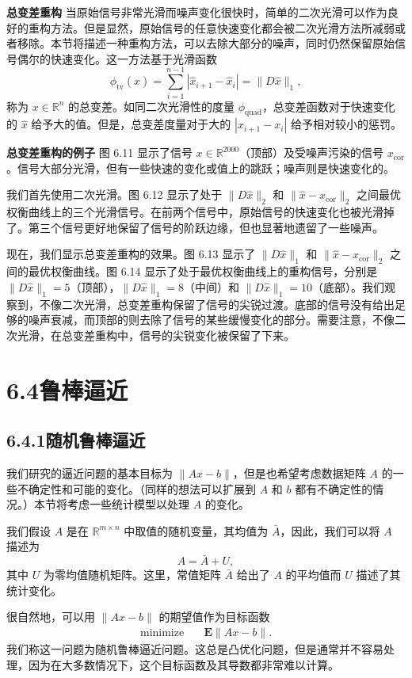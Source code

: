 \documentclass[UTF8,12pt,a4paper,fontset=fandol]{ctexart}
\begin{document}
\noindent\textbf{总变差重构}\quad
当原始信号非常光滑而噪声变化很快时，简单的二次光滑可以作为良好的重构方法。但是显然，原始信号的任意快速变化都会被二次光滑方法所减弱或者移除。本节将描述一种重构方法，可以去除大部分的噪声，同时仍然保留原始信号偶尔的快速变化。这一方法基于光滑函数
\[
\phi_{\mathrm{tv}}(\hat{x})=\sum_{i=1}^{n-1}|\hat{x}_{i+1}-\hat{x}_i|=\|D\hat{x}\|_1,
\]
称为 $x\in\mathbb{R}^n$ 的总变差。如同二次光滑性的度量 $\phi_{\mathrm{quad}}$，总变差函数对于快速变化的 $\hat{x}$ 给予大的值。但是，总变差度量对于大的 $|x_{i+1}-x_i|$ 给予相对较小的惩罚。

\noindent\textbf{总变差重构的例子}\quad
图 6.11 显示了信号 $x\in\mathbb{R}^{2000}$（顶部）及受噪声污染的信号 $x_{\mathrm{cor}}$。信号大部分光滑，但有一些快速的变化或值上的跳跃；噪声则是快速变化的。

我们首先使用二次光滑。图 6.12 显示了处于 $\|D\hat{x}\|_2$ 和 $\|\hat{x}-x_{\mathrm{cor}}\|_2$ 之间最优权衡曲线上的三个光滑信号。在前两个信号中，原始信号的快速变化也被光滑掉了。第三个信号更好地保留了信号的阶跃边缘，但也显著地遗留了一些噪声。

现在，我们显示总变差重构的效果。图 6.13 显示了 $\|D\hat{x}\|_1$ 和 $\|\hat{x}-x_{\mathrm{cor}}\|_2$ 之间的最优权衡曲线。图 6.14 显示了处于最优权衡曲线上的重构信号，分别是 $\|D\hat{x}\|_1=5$（顶部），$\|D\hat{x}\|_1=8$（中间）和 $\|D\hat{x}\|_1=10$（底部）。我们观察到，不像二次光滑，总变差重构保留了信号的尖锐过渡。底部的信号没有给出足够的噪声衰减，而顶部的则去除了信号的某些缓慢变化的部分。需要注意，不像二次光滑，在总变差重构中，信号的尖锐变化被保留了下来。

\section*{6.4\quad 鲁棒逼近}

\subsection*{6.4.1\quad 随机鲁棒逼近}

我们研究的逼近问题的基本目标为 $\|Ax-b\|$，但是也希望考虑数据矩阵 $A$ 的一些不确定性和可能的变化。（同样的想法可以扩展到 $A$ 和 $b$ 都有不确定性的情况。）本节将考虑一些统计模型以处理 $A$ 的变化。

我们假设 $A$ 是在 $\mathbb{R}^{m\times n}$ 中取值的随机变量，其均值为 $\bar{A}$，因此，我们可以将 $A$ 描述为
\[
A=\bar{A}+U,
\]
其中 $U$ 为零均值随机矩阵。这里，常值矩阵 $\bar{A}$ 给出了 $A$ 的平均值而 $U$ 描述了其统计变化。

很自然地，可以用 $\|Ax-b\|$ 的期望值作为目标函数
\begin{equation}
\begin{aligned}
\text{minimize}\quad & \mathbf{E}\|Ax-b\|.
\end{aligned}
\tag{6.13}
\end{equation}
我们称这一问题为随机鲁棒逼近问题。这总是凸优化问题，但是通常并不容易处理，因为在大多数情况下，这个目标函数及其导数都非常难以计算。
\end{document}
